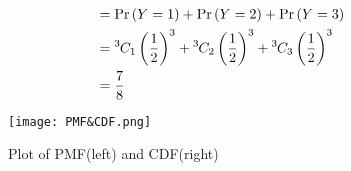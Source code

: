 \documentclass[journal,12pt,two column]{IEEEtran}
\begin{document}
\begin{enumerate}[label = (\roman*)]
    \begin{align}
         &= \Pr\left(Y = 1\right)+\Pr\left(Y = 2\right)+\Pr\left(Y = 3\right) \\
         &= {{}^{3}\mkern-1muC_{1}} \left(\frac{1}{2}\right)^3 + {{}^{3}\mkern-1muC_{2}}\left(\frac{1}{2}\right)^3 + {{}^{3}\mkern-1muC_{3}} \left(\frac{1}{2}\right)^3\\
         &= \frac{7}{8}
    \end{align}
\end{enumerate} 
\begin{figure}[ht!]
\centering
\texttt{[image: PMF\&CDF.png]}
\caption{Plot of PMF(left) and CDF(right) } 
\label{Fig 1}
\end{figure}
\end{document}
